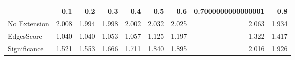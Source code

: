 \begin{tabular}{lrrrrrrrr}
\toprule
{} &   0.1 &   0.2 &   0.3 &   0.4 &   0.5 &   0.6 & 0.7000000000000001 &   0.8 \\
\midrule
No Extension & 2.008 & 1.994 & 1.998 & 2.002 & 2.032 & 2.025 &              2.063 & 1.934 \\
EdgesScore   & 1.040 & 1.040 & 1.053 & 1.057 & 1.125 & 1.197 &              1.322 & 1.417 \\
Significance & 1.521 & 1.553 & 1.666 & 1.711 & 1.840 & 1.895 &              2.016 & 1.926 \\
\bottomrule
\end{tabular}

